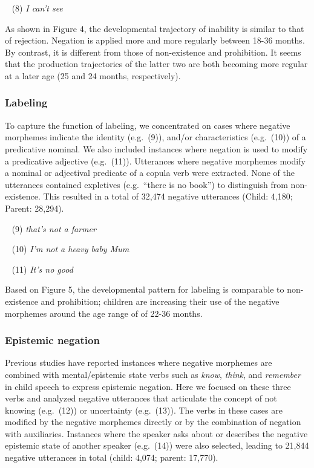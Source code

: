 \documentclass[10pt, letterpaper]{article}
\begin{document}
~ (8) \emph{I can't see}

As shown in Figure 4, the developmental trajectory of inability is
similar to that of rejection. Negation is applied more and more
regularly between 18-36 months. By contrast, it is different from those
of non-existence and prohibition. It seems that the production
trajectories of the latter two are both becoming more regular at a later
age (25 and 24 months, respectively).

\hypertarget{labeling}{%
\subsubsection{Labeling}\label{labeling}}

To capture the function of labeling, we concentrated on cases where
negative morphemes indicate the identity (e.g.~(9)), and/or
characteristics (e.g.~(10)) of a predicative nominal. We also included
instances where negation is used to modify a predicative adjective
(e.g.~(11)). Utterances where negative morphemes modify a nominal or
adjectival predicate of a copula verb were extracted. None of the
utterances contained expletives (e.g.~``there is no book'') to
distinguish from non-existence. This resulted in a total of 32,474
negative utterances (Child: 4,180; Parent: 28,294).

~ (9) \emph{that's not a farmer}

~ (10) \emph{I'm not a heavy baby Mum}

~ (11) \emph{It's no good}

Based on Figure 5, the developmental pattern for labeling is comparable
to non-existence and prohibition; children are increasing their use of
the negative morphemes around the age range of of 22-36 months.

\hypertarget{epistemic-negation}{%
\subsubsection{Epistemic negation}\label{epistemic-negation}}

Previous studies have reported instances where negative morphemes are
combined with mental/epistemic state verbs such as \emph{know},
\emph{think}, and \emph{remember} in child speech to express epistemic
negation. Here we focused on these three verbs and analyzed negative
utterances that articulate the concept of not knowing (e.g.~(12)) or
uncertainty (e.g.~(13)). The verbs in these cases are modified by the
negative morphemes directly or by the combination of negation with
auxiliaries. Instances where the speaker asks about or describes the
negative epistemic state of another speaker (e.g.~(14)) were also
selected, leading to 21,844 negative utterances in total (child: 4,074;
parent: 17,770).
\end{document}
